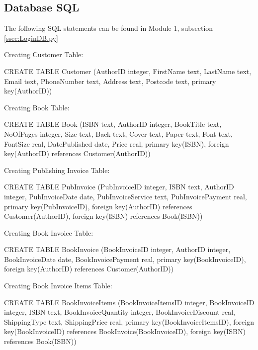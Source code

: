 \subsection{Database SQL}

The following SQL statements can be found in Module 1,  subsection \ref{ssec:LoginDB.py}

Creating Customer Table:
\begin{sql}
CREATE TABLE Customer 
                 (AuthorID integer,
                 FirstName text,
                 LastName text,
                 Email text,
                 PhoneNumber text,
                 Address text,
                 Postcode text,
                 primary key(AuthorID))
\end{sql}

Creating Book Table:
\begin{sql}
CREATE TABLE Book 
                 (ISBN text,
                 AuthorID integer,
                 BookTitle text,
                 NoOfPages integer,
                 Size text,
                 Back text,
                 Cover text,
                 Paper text,
                 Font text,
                 FontSize real,
                 DatePublished date,
                 Price real,
                 primary key(ISBN),
                 foreign key(AuthorID) references Customer(AuthorID))
\end{sql}

Creating Publishing Invoice Table:
\begin{sql}
CREATE TABLE PubInvoice 
                 (PubInvoiceID integer,
                 ISBN text,
                 AuthorID integer,
                 PubInvoiceDate date,
                 PubInvoiceService text,
                 PubInvoicePayment real,
                 primary key(PubInvoiceID),
                 foreign key(AuthorID) references Customer(AuthorID),
                 foreign key(ISBN) references Book(ISBN))
\end{sql}

Creating Book Invoice Table:
\begin{sql}
CREATE TABLE BookInvoice
                 (BookInvoiceID integer,
                 AuthorID integer,
                 BookInvoiceDate date,
                 BookInvoicePayment real,
                 primary key(BookInvoiceID),
                 foreign key(AuthorID) references Customer(AuthorID))
\end{sql}

Creating Book Invoice Items Table:
\begin{sql}
CREATE TABLE BookInvoiceItems
                 (BookInvoiceItemsID integer,
                 BookInvoiceID integer,
                 ISBN text,
                 BookInvoiceQuantity integer,
                 BookInvoiceDiscount real,
                 ShippingType text,
                 ShippingPrice real,
                 primary key(BookInvoiceItemsID),
                 foreign key(BookInvoiceID) references BookInvoice(BookInvoiceID),
                 foreign key(ISBN) references Book(ISBN))
\end{sql}

